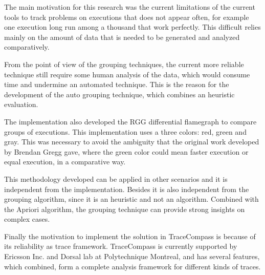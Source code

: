 The main motivation for this research was the current limitations of the current tools to track problems on executions that does not appear often, for example one execution long run among a thousand that work perfectly. 
This difficult relies mainly on the amount of data that is needed to be generated and analyzed comparatively. 

From the point of view of the grouping techniques, the current more reliable technique still require some human analysis of the data, which would consume time and undermine an automated technique. This is the reason for the development of the auto grouping technique, which combines an heuristic evaluation.


The implementation also developed the RGG differential flamegraph to compare groups of executions. This implementation uses a three colors: red, green and gray. This was necessary to avoid the ambiguity that the original work developed by Brendan Gregg gave, where the green color could mean faster execution or equal execution, in a comparative way.

This methodology developed can be applied in other scenarios and it is independent from the implementation. Besides it is also independent from the grouping algorithm, since it is an heuristic and not an algorithm. Combined with the Apriori algorithm, the grouping technique can provide strong insights on complex cases.

Finally the motivation to implement the solution in TraceCompass is because of its reliability as trace framework. TraceCompass is currently supported by Ericsson Inc. and Dorsal lab at Polytechnique Montreal, and has several features, which combined, form a complete analysis framework for different kinds of traces.